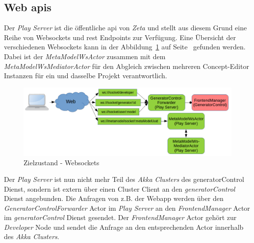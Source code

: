 \subsection{Web \acp{api}}

Der \textit{Play Server} ist die öffentliche \ac{api} von \textit{Zeta} und stellt aus diesem Grund eine Reihe von Websockets und \ac{rest} Endpoints zur Verfügung. Eine Übersicht der verschiedenen Websockets kann in der Abbildung~\ref{fig:ZETA_WS_NEW} auf Seite~\pageref{fig:ZETA_WS_NEW} gefunden werden. Dabei ist der \textit{MetaModelWsActor} zusammen mit dem \textit{MetaModelWsMediatorActor} für den Abgleich zwischen mehreren Concept-Editor Instanzen für ein und dasselbe Projekt verantwortlich.

\begin{figure}
    \centering
    \includegraphics[width=5in]{figures/actor_play_final.png}
    \caption{Zielzustand - Websockets}
    \label{fig:ZETA_WS_NEW}
\end{figure}

Der \textit{Play Server} ist nun nicht mehr Teil des \textit{Akka Clusters} des {generatorControl} Dienst, sondern ist extern über einen Cluster Client an den \textit{generatorControl} Dienst angebunden. Die Anfragen von z.B. der Webapp werden über den \textit{GeneratorControlForwarder} Actor im \textit{Play Server} an den \textit{FrontendManager} Actor im \textit{generatorControl} Dienst \cite{akka_cluster_client} gesendet. Der \textit{FrontendManager} Actor gehört zur \textit{Developer} Node und sendet die Anfrage an den entsprechenden Actor innerhalb des \textit{Akka Clusters}.

